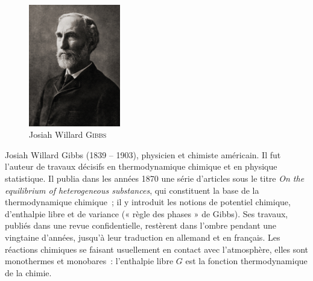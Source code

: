 \documentclass{article}
\begin{document}
\begin{figure}
    \includegraphics[width=4cm]{ressources/Josiah_Willard_Gibbs.jpg}
    \caption*{Josiah Willard \textsc{Gibbs}}
\end{figure}
Josiah Willard Gibbs (1839 – 1903), physicien et chimiste américain. Il fut  l’auteur de travaux décisifs en thermodynamique chimique et en physique statistique. Il publia dans les années 1870 une série d’articles sous le titre \textit{On the equilibrium of heterogeneous substances}, qui constituent la base de la thermodynamique chimique~; il y introduit les notions de potentiel chimique, d’enthalpie libre et de variance (« règle des phases » de Gibbs). Ses travaux, publiés dans une revue confidentielle, restèrent dans l’ombre pendant une vingtaine d’années, jusqu’à leur traduction en allemand et en français. Les réactions chimiques se faisant usuellement en contact avec l’atmosphère, elles sont monothermes et monobares~: l’enthalpie libre $G$ est la fonction thermodynamique de la chimie.

\vspace{0.75cm}
\end{document}
